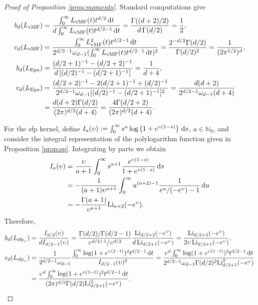 \documentclass[oneside,11pt]{article}
\begin{document}
\begin{proof}[Proof of Proposition \ref{prop:moments}]
Standard computations give
\begin{align*}
    b_{d}(L_\mathrm{vMF}) &= \frac{\int_0^\infty L_\mathrm{vMF}(t) t^{d/2}\,\rd t}{d\int_0^\infty L_\mathrm{vMF}(t) t^{d/2-1}\,\rd t}
    =\frac{\Gamma((d+2)/2)}{d\,\Gamma(d/2)}
    =\frac{1}{2},\\
    v_{d}(L_\mathrm{vMF})&=\frac{\int_0^\infty L_\mathrm{vMF}^2(t) t^{d/2-1}\,\rd t}{2^{d/2-1}\om{d-1}(\int_0^\infty L_\mathrm{vMF}(t) t^{d/2-1}\,\rd t)^2}
    =\frac{2^{-d/2}\Gamma(d/2)}{\Gamma(d/2)^2}=\frac{1}{(2\pi^{1/2})^d},\\
    b_{d}(L_\mathrm{Epa}) &%
    =\frac{(d/2+1)^{-1}-(d/2+2)^{-1}}{d\,[(d/2)^{-1}-(d/2+1)^{-1}]}
    =\frac{1}{d+4},\\
    v_{d}(L_\mathrm{Epa})&%
    = \frac{(d/2+2)^{-1}-2(d/2+1)^{-1}+(d/2)^{-1}}{2^{d/2-1}\om{d-1}[(d/2)^{-1}-(d/2+1)^{-1}]^2}
    = \frac{d (d + 2)}{2^{d/2-1}\om{d-1}(d+4)}\\
    &=\frac{d (d + 2)\Gamma(d/2)}{(2\pi)^{d/2}(d+4)}=\frac{4\Gamma(d/2+2)}{(2\pi)^{d/2}(d+4)}.
\end{align*}

For the sfp kernel, define $I_a(\upsilon):=\int_0^\infty s^a \log \left(1+e^{\upsilon(1-s)}\right) \,\mathrm{d} s$, $a\in\mathbb{N}_0$, and consider the integral representation of the polylogarithm function given in Proposition \ref{prop:sp}. Integrating by parts we obtain
\begin{align*}
    I_a(\upsilon)&=\frac{\upsilon}{a + 1} \int_0^\infty s^{a+1} \frac{e^{\upsilon(1-s)}}{1+e^{\upsilon(1-s)}} \,\mathrm{d} s\\
    &=-\frac{1}{(a+1)\upsilon^{a+1}}\int_0^\infty u^{(a+2)-1} \frac{1}{e^u /(-e^\upsilon)-1} \,\mathrm{d} u\\
    &=-\frac{\Gamma(a+1)}{\upsilon^{a+1}} \mathrm{Li}_{a+2}(-e^\upsilon).
\end{align*}
Therefore,
\begin{align*}
    b_d(L_{\mathrm{sfp}_\upsilon}) &= \frac{I_{d/2}(\upsilon)}{dI_{d/2-1}(\upsilon)}
    =\frac{\Gamma(d/2)/\Gamma(d/2-1)}{\upsilon^{d/2+1}/\upsilon^{d/2}}\frac{\mathrm{Li}_{d/2+2}(-e^\upsilon)}{d\,\mathrm{Li}_{d/2+1}(-e^\upsilon)}=\frac{\mathrm{Li}_{d/2+2}(-e^\upsilon)}{2\upsilon\,\mathrm{Li}_{d/2+1}(-e^\upsilon)},\\
    v_d(L_{\mathrm{sfp}_\upsilon})&= \frac{1}{2^{d/2-1}\omega_{d-1}}\frac{\int_0^\infty \log(1+e^{\upsilon(1-t)})^2t^{d/2-1} \,\mathrm{d} t}{I_{d/2-1}(\upsilon)^2}= \frac{\upsilon^d\int_0^\infty \log(1+e^{\upsilon(1-t)})^2 t^{d/2-1} \,\mathrm{d} t}{2^{d/2-1}\omega_{d-1}\Gamma(d/2)^2\mathrm{Li}^2_{d/2+1}(-e^\upsilon)}\\
    &= \frac{\upsilon^d\int_0^\infty \log(1+e^{\upsilon(1-t)})^2 t^{d/2-1} \,\mathrm{d} t}{(2\pi)^{d/2}\Gamma(d/2)\mathrm{Li}^2_{d/2+1}(-e^\upsilon)}.
\end{align*}
\end{proof}
\end{document}
